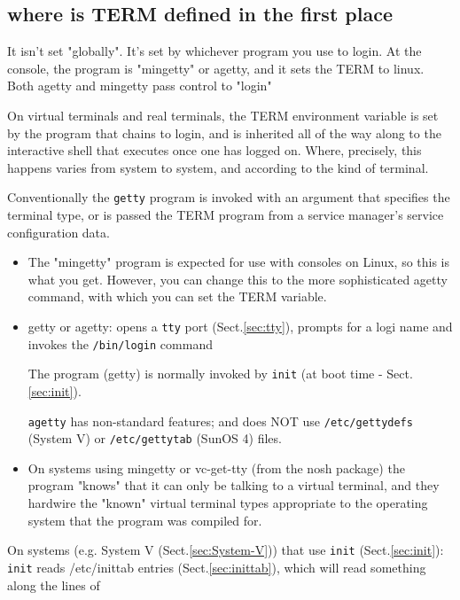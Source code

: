 \subsection{where is TERM defined in the first place}

It isn't set "globally". It's set by whichever program you use to login. 
At the console, the program is "mingetty" or agetty, and it sets the TERM to
linux.  Both agetty and mingetty pass control to "login"

On virtual terminals and real terminals, the TERM environment variable is set by
the program that chains to login, and is inherited all of the way along to the
interactive shell that executes once one has logged on. Where, precisely, this
happens varies from system to system, and according to the kind of terminal.

Conventionally the \verb!getty! program is invoked with an argument that
specifies the terminal type, or is passed the TERM program from a service
manager's service configuration data.
\begin{itemize}
  
  \item The "mingetty" program is expected for use with consoles on Linux, so
  this is what you get. However, you can change this to the more sophisticated
  agetty command, with which you can set the TERM variable.
  
  
  \item getty or agetty: opens a \verb!tty! port (Sect.\ref{sec:tty}), prompts
  for a logi name and invokes the \verb!/bin/login! command
  
  The program (getty) is normally invoked by \verb!init! (at boot time -
  Sect.\ref{sec:init}).
  
  \verb!agetty! has non-standard features; and does NOT use
  \verb!/etc/gettydefs! (System V) or \verb!/etc/gettytab! (SunOS 4) files.   
  
  \item On systems using mingetty or vc-get-tty (from the nosh package) the
  program "knows" that it can only be talking to a virtual terminal, and they
  hardwire the "known" virtual terminal types appropriate to the operating
  system that the program was compiled for.
  

\end{itemize}

On systems (e.g. System V (Sect.\ref{sec:System-V})) that use \verb!init!
(Sect.\ref{sec:init}): \verb!init! reads /etc/inittab entries
(Sect.\ref{sec:inittab}), which will read something along the lines of
  

